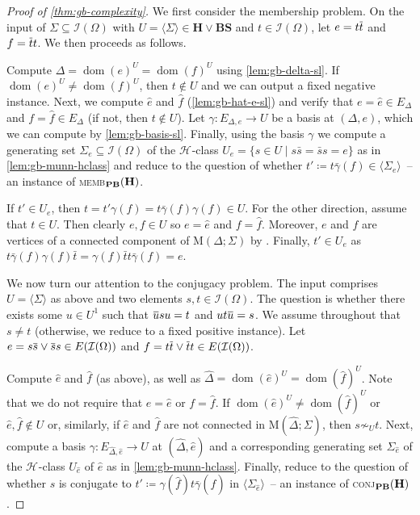 \documentclass[anonymous,letter,UKenglish,cleveref,autoref,thm-restate]{lipics-v2021}
\newcommand{\sse}{\subseteq}
\newcommand{\dom}{\operatorname{dom}}
\newcommand{\vH}{\ensuremath{\mathbf{H}}}
\newcommand{\vBS}{\ensuremath{\mathbf{BS}}}  \newcommand{\vBM}{\ensuremath{\mathbf{BM}}}
\newcommand{\ISym}{\cI}
\newcommand*{\gH}[1][]{\mathrel{\mathcal{H}_{#1}}}
\newcommand\nindent{.5pt}
\newcommand\noverline[1]{\kern\nindent\overline{\kern-\nindent#1\kern-\nindent}\kern\nindent}
\newcommand{\ov}[1]{\noverline{#1}}
\newcommand{\cI}{\mathcal{I}}
\theoremstyle{plain}
\theoremstyle{plain}
\newcommand{\dMemb}[2][]{\textup{\textsc{memb${}_{\mathbf{#1}}\expandafter\ifx\expandafter\relax\detokenize{#2}\relax\else(#2)\fi$}}}
\newcommand{\dConj}[2][]{\textup{\textsc{conj${}_{\mathbf{#1}}\expandafter\ifx\expandafter\relax\detokenize{#2}\relax\else(#2)\fi$}}}
\begin{document}
\begin{proof}[Proof of \cref{thm:gb-complexity}]
  We first consider the membership problem.
  On the input of $\Sigma \sse \ISym(\Omega)$ with $U = \langle \Sigma \rangle \in \vH \vee \vBS$ and $t \in \ISym(\Omega)$, let $e = t \ov{t}$ and $f = \ov{t} t$.
  We then proceeds as follows.

Compute $\Delta = \dom(e)^U = \dom(f)^U$ using \cref{lem:gb-delta-sl}.
 If $ \dom(e)^U \neq \dom(f)^U$, then $t \not\in U$ and we can output a fixed negative instance.
 Next, we compute $\hat e$ and $\hat f$ (\cref{lem:gb-hat-e-sl}) and verify that $ e = \hat e \in E_\Delta$ and $f = \hat f \in E_\Delta$ (if not, then $t \not\in  U$).
  Let $\gamma \colon E_{\Delta, e} \to U$ be a basis at $(\Delta, e)$, which we can compute by \cref{lem:gb-basis-sl}.
  Finally, using the basis $\gamma$ we compute a generating set $\Sigma_{e}\sse \ISym(\Omega)$ of the $\gH$-class $U_{ e} = \{s \in U \mid s\bar s = \bar s s =  e\}$ as in \cref{lem:gb-munn-hclass} and reduce to the question of whether $t' \coloneqq t \bar \gamma(f) \in \langle \Sigma_{e} \rangle$~-- an instance of \dMemb[PB]{\vH}.

  If $t' \in U_e$, then $t = t' \gamma(f) = t \bar \gamma(f) \gamma(f) \in U$.
	For the other direction, assume that $t \in U$.
	Then clearly $e, f \in U$ so $e = \hat e$ and $f = \hat f$.
	Moreover, $e$ and $f$ are vertices of a connected component of $\mathrm{M}(\Delta; \Sigma)$ by .
  Finally, $t' \in U_{e}$ as $t \bar \gamma(f) \gamma(f) \bar t = \gamma(f) \bar t t \bar \gamma(f)  = e$.

	\medskip

  We now turn our attention to the conjugacy problem.
	The input comprises $U = \langle \Sigma \rangle$ as above and two elements $s, t \in \ISym(\Omega)$.
	The question is whether there exists some $u \in U^1$ such that $\ov u s u = t$ and $u t \ov u = s$.
  We assume throughout that $s \neq t$ (otherwise, we reduce to a fixed positive instance).
	Let $e = s\ov s \vee \ov s s \in  E(\ISym(\Omega))$ and $f = t\ov t \vee \ov t t\in E(\ISym(\Omega))$.
	
  Compute $\hat e$ and $\hat f$ (as above), as well as $\hat \Delta = \dom(\hat e)^U = \dom(\hat f)^U$. 
  Note that we do not require that $e = \hat e$ or $f = \hat f$.
  If $\dom(\hat e)^U \neq \dom(\hat f)^U$ or $\hat e, \hat f \not\in U$ or, similarly, if $\hat e$ and $\hat f$ are not connected in $\mathrm{M}(\hat\Delta; \Sigma)$, then $s \not\sim_U t$.
  Next, compute a basis $\gamma \colon E_{\hat\Delta, \hat e} \to U$ at $(\hat\Delta,\hat e)$ and a corresponding generating set $\Sigma_{\hat e}$ of the $\gH$-class $U_{\hat e}$ of $\hat e$ as in \cref{lem:gb-munn-hclass}. 
	Finally, reduce to the question of whether $s$ is conjugate to $t' \coloneqq \gamma(\hat f) t \bar \gamma(\hat f)$ in $\langle \Sigma_{\hat e} \rangle$~-- an instance of \dConj[PB]{\vH}.


\end{proof}
\end{document}
